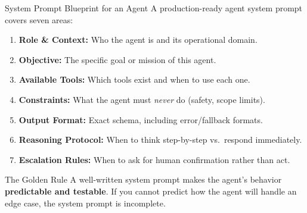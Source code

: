 \documentclass{beamer}
\begin{document}
\begin{frame}{System Prompt Blueprint for an Agent}
    A production-ready agent system prompt covers seven areas:

    \vspace{0.2cm}
    \begin{enumerate}
        \item \textbf{Role \& Context:} Who the agent is and its operational domain.
        \item \textbf{Objective:} The specific goal or mission of this agent.
        \item \textbf{Available Tools:} Which tools exist and when to use each one.
        \item \textbf{Constraints:} What the agent must \emph{never} do (safety, scope limits).
        \item \textbf{Output Format:} Exact schema, including error/fallback formats.
        \item \textbf{Reasoning Protocol:} When to think step-by-step vs.\ respond immediately.
        \item \textbf{Escalation Rules:} When to ask for human confirmation rather than act.
    \end{enumerate}

    \vspace{0.2cm}
    \begin{alertblock}{The Golden Rule}
        A well-written system prompt makes the agent's behavior \textbf{predictable and testable}.
        If you cannot predict how the agent will handle an edge case, the system prompt is incomplete.
    \end{alertblock}
\end{frame}
\end{document}
